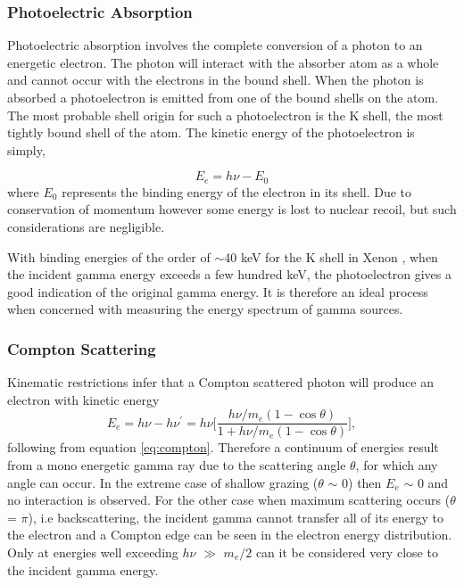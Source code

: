 \subsubsection{Photoelectric Absorption}
Photoelectric absorption involves the complete conversion of a photon to an energetic electron. The photon will interact with the absorber atom as a whole and cannot occur with the electrons in the bound shell. When the photon is absorbed a photoelectron is emitted from one of the bound shells on the atom. The most probable shell origin for such a photoelectron is the K shell, the most tightly bound shell of the atom. The kinetic energy of the photoelectron is simply,

\begin{equation}
E_{e} = h\nu - E_{0}
\end{equation}
where $E_{0}$ represents the binding energy of the electron in its shell. Due to conservation of momentum however some energy is lost to nuclear recoil, but such considerations are negligible.

With binding energies of the order of $\sim$40 keV for the K shell in Xenon \cite{nobleGasDetectors}, when the incident gamma energy exceeds a few hundred keV, the photoelectron gives a good indication of the original gamma energy. It is therefore an ideal process when concerned with measuring the energy spectrum of gamma sources.

\subsubsection{Compton Scattering}
Kinematic restrictions infer that a Compton scattered photon will produce an electron with kinetic energy 
\begin{equation}
E_{e} = h\nu - h\nu^{'} = h\nu\Bigg[\frac{h\nu/m_{e}(1-\cos{\theta})}{1 + h\nu/m_{e}(1-\cos{\theta})}\Bigg], 
\label{eq:compton2}
\end{equation}
following from equation \ref{eq:compton}. Therefore a continuum of energies result from a mono energetic gamma ray due to the scattering angle $\theta$, for which any angle can occur. In the extreme case of shallow grazing ($\theta$ $\sim$ 0) then $E_{e}$ $\sim$ 0 and no interaction is observed. For the other case when maximum scattering occurs ($\theta$ = $\pi$), i.e backscattering, the incident gamma cannot transfer all of its energy to the electron and a Compton edge can be seen in the electron energy distribution. Only at energies well exceeding $h\nu$ $\gg$ $m_{e}/2$ can it be considered very close to the incident gamma energy.

